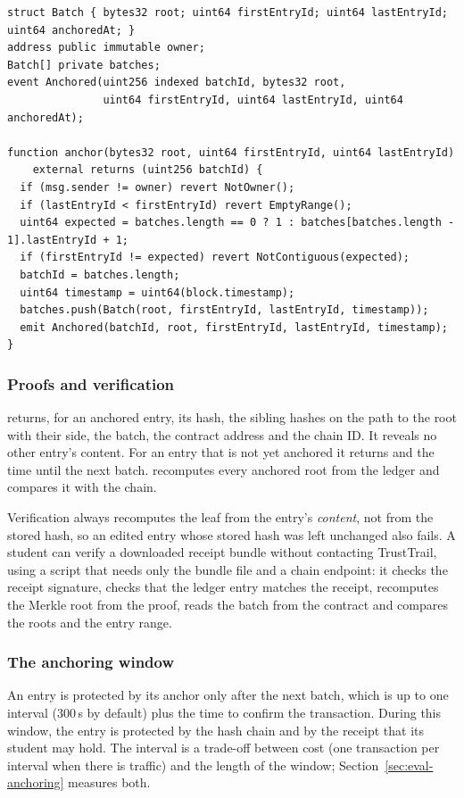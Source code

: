 \begin{lstlisting}[caption={Core of the anchor contract (Solidity 0.8.28)}, label={lst:contract}]
struct Batch { bytes32 root; uint64 firstEntryId; uint64 lastEntryId; uint64 anchoredAt; }
address public immutable owner;
Batch[] private batches;
event Anchored(uint256 indexed batchId, bytes32 root,
               uint64 firstEntryId, uint64 lastEntryId, uint64 anchoredAt);

function anchor(bytes32 root, uint64 firstEntryId, uint64 lastEntryId)
    external returns (uint256 batchId) {
  if (msg.sender != owner) revert NotOwner();
  if (lastEntryId < firstEntryId) revert EmptyRange();
  uint64 expected = batches.length == 0 ? 1 : batches[batches.length - 1].lastEntryId + 1;
  if (firstEntryId != expected) revert NotContiguous(expected);
  batchId = batches.length;
  uint64 timestamp = uint64(block.timestamp);
  batches.push(Batch(root, firstEntryId, lastEntryId, timestamp));
  emit Anchored(batchId, root, firstEntryId, lastEntryId, timestamp);
}
\end{lstlisting}

\subsubsection{Proofs and verification}
 returns, for an anchored entry, its hash, the sibling hashes on the path to the root with their side, the batch, the contract address and the chain ID. It reveals no other entry's content. For an entry that is not yet anchored it returns  and the time until the next batch.  recomputes every anchored root from the ledger and compares it with the chain.

Verification always recomputes the leaf from the entry's \emph{content}, not from the stored hash, so an edited entry whose stored hash was left unchanged also fails. A student can verify a downloaded receipt bundle without contacting TrustTrail, using a script that needs only the bundle file and a chain endpoint: it checks the receipt signature, checks that the ledger entry matches the receipt, recomputes the Merkle root from the proof, reads the batch from the contract and compares the roots and the entry range.

\subsubsection{The anchoring window}
An entry is protected by its anchor only after the next batch, which is up to one interval (300\,s by default) plus the time to confirm the transaction. During this window, the entry is protected by the hash chain and by the receipt that its student may hold. The interval is a trade-off between cost (one transaction per interval when there is traffic) and the length of the window; Section~\ref{sec:eval-anchoring} measures both.

